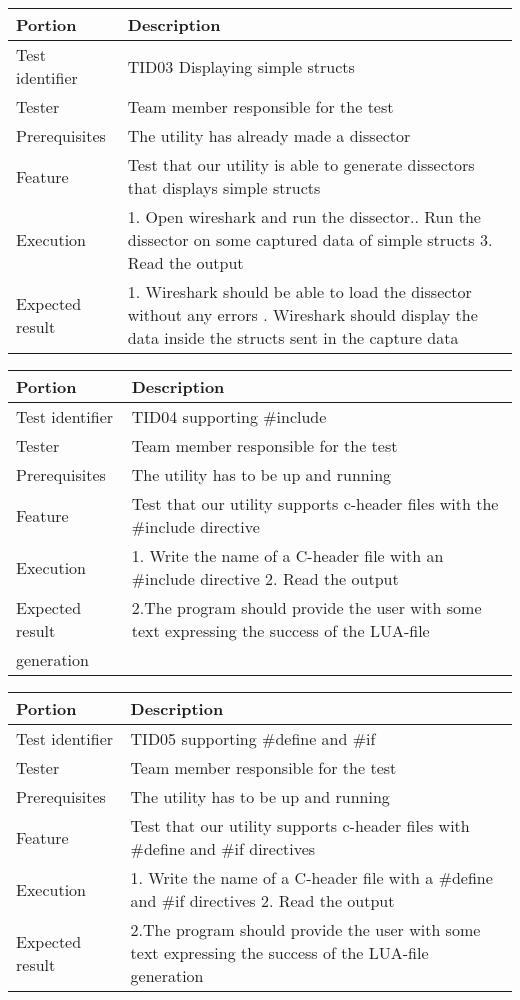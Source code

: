 \begin{table}[H]
\begin{tabularx}{\textwidth}{l X}
\hline\hline
Portion & Description\\[0.5ex]
\hline
Test identifier & TID03 Displaying simple structs\\[0.5ex]
Tester & Team member responsible for the test\\[0.5ex]
Prerequisites & The utility has already made a dissector\\[0.5ex]
Feature & Test that our utility is able to generate dissectors that displays simple structs \\
Execution & 1. Open wireshark and run the dissector.\newline
		2. Run the dissector on some captured data of simple structs
		3. Read the output \\
Expected result & 1. Wireshark should be able to load the dissector without any errors \newline
			3. Wireshark should display the data inside the structs sent in the capture data \\[0.5ex]
\hline\hline
\end{tabularx}


\begin{tabularx}{\textwidth}{l X}
\hline\hline
Portion & Description\\[0.5ex]
\hline
Test identifier & TID04 supporting \#include\\[0.5ex]
Tester & Team member responsible for the test\\[0.5ex]
Prerequisites & The utility has to be up and running\\[0.5ex]
Feature & Test that our utility supports c-header files with the \#include directive \\
Execution & 1. Write the name of a C-header file with an \#include directive
		2. Read the output\\
Expected result & 2.The program should provide the user with some text expressing the success of the LUA-file\\ generation\\[0.5ex]
\hline\hline
\end{tabularx}

\begin{tabularx}{\textwidth}{l X}
\hline\hline
Portion & Description\\[0.5ex]
\hline
Test identifier & TID05 supporting \#define and \#if\\[0.5ex]
Tester & Team member responsible for the test\\[0.5ex]
Prerequisites & The utility has to be up and running\\[0.5ex]
Feature & Test that our utility supports c-header files with \#define and \#if directives \\
Execution & 1. Write the name of a C-header file with a \#define and \#if directives
		2. Read the output\\
Expected result & 2.The program should provide the user with some text expressing the success of the LUA-file generation\\[0.5ex]
\hline\hline
\end{tabularx}


\end{table}
